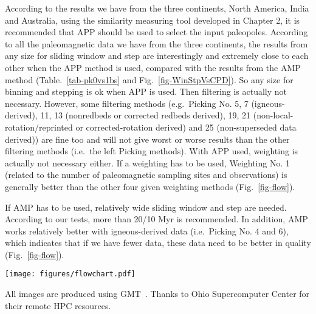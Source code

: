 According to the results we have from the three continents, North America, India
and Australia, using the similarity measuring tool developed in Chapter 2, it is
recommended that APP should be used to select the input paleopoles. According to
all the paleomagnetic data we have from the three continents, the results from
any size for sliding window and step are interestingly and extremely close to
each other when the APP method is used, compared with the results from the AMP
method (Table.~\ref{tab-pk0vs1bs} and Fig.~\ref{fig-WinStpVsCPD}). So any size
for binning and stepping is ok when APP is used. Then filtering is actually not
necessary. However, some filtering methods (e.g.\ Picking No. 5, 7
(igneous-derived), 11, 13 (nonredbeds or corrected redbeds derived), 19, 21
(non-local-rotation/reprinted or corrected-rotation derived) and 25
(non-superseded data derived)) are fine too and will not give worst or worse
results than the other filtering methods (i.e.\ the left Picking methods). With
APP used, weighting is actually not necessary either. If a weighting has to be
used, Weighting No. 1 (related to the number of paleomagnetic sampling sites and
observations) is generally better than the other four given weighting methods
(Fig.~\ref{fig-flow}).

If AMP has to be used, relatively wide sliding window and step are needed.
According to our tests, more than 20/10 Myr is recommended. In addition, AMP
works relatively better with igneous-derived data (i.e.\ Picking No. 4 and 6),
which indicates that if we have fewer data, these data need to be better in
quality (Fig.~\ref{fig-flow}).

\begin{figure*}
\centering
\texttt{[image: figures/flowchart.pdf]}
\caption[Flowchart]{Flowchart for recommended procedure of processing
  paleomagnetic data.}\label{fig-flow}
\end{figure*}

\begin{acknowledgments}
All images are produced using GMT~\cite{W13}. Thanks to Ohio Supercomputer
Center for their remote HPC resources.
\end{acknowledgments}

